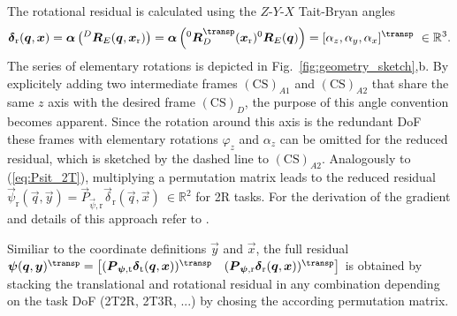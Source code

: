 \documentclass[graybox,vecphys]{svmult}
\newcommand{\rotmat}[2]{{{ }^{#1}\boldsymbol{R}}_{#2}}
\newcommand{\ks}[1]{{(\mathrm{CS})_{#1}}}
\newcommand{\Res}[0]{\vec{\delta}}
\newcommand{\ResR}[0]{\vec{\psi}}
\begin{document}
The rotational residual is calculated using the $Z$-$Y$-$X$ Tait-Bryan angles
\begin{equation}
\Res_{\mathrm{r}}(\vec{q},\vec{x})
=
\vec{\alpha}\left(\rotmat{D}{E}(\vec{q},\vec{x}_{\mathrm{r}})\right)
=
\vec{\alpha}\left(\rotmat{0}{D}^\transp (\vec{x}_{\mathrm{r}})\rotmat{0}{E}(\vec{q})\right)
=[\alpha_z,\alpha_y,\alpha_x]^\transp
~\in {\mathbb{R}^3}.
\end{equation}
The series of elementary rotations is depicted in Fig.~\ref{fig:geometry_sketch},b.
By explicitely adding two intermediate frames $\ks{A1}$ and $\ks{A2}$ that share the same $z$ axis with the desired frame $\ks{D}$, the purpose of this angle convention becomes apparent. 
Since the rotation around this axis is the redundant DoF these frames with elementary rotations $\varphi_z$ and $\alpha_z$ can be omitted for the reduced residual, which is sketched by the dashed line to $\ks{A2}$. %
Analogously to (\ref{eq:Psit_2T}), multiplying a permutation matrix  leads to the reduced residual $\ResR_\mathrm{r}(\vec{q},\vec{y}) = \vec{P}_{\ResR,\mathrm{r}} \Res_{\mathrm{r}}(\vec{q},\vec{x})~\in {\mathbb{R}^2}$ for 2R tasks. For the derivation of the gradient and details of this approach refer to \cite{SchapplerTapOrt2019a}. 

Similiar to the coordinate definitions $\vec{y}$ and $\vec{x}$, the full residual
$
\ResR(\vec{q},\vec{y})^\transp = \begin{bmatrix}
(\vec{P}_{\ResR, \mathrm{t}}\Res_\mathrm{t}(\vec{q},\vec{x}))^\transp &
(\vec{P}_{\ResR, \mathrm{r}}\Res_\mathrm{r}(\vec{q},\vec{x}))^\transp
\end{bmatrix}
$
is obtained by stacking the translational and rotational residual in any combination depending on the task DoF (2T2R, 2T3R, ...) by chosing the according permutation matrix. 
\end{document}
